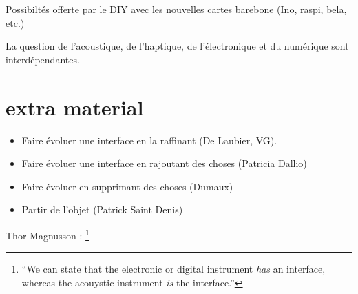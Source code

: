Possibiltés offerte par le DIY avec les nouvelles cartes barebone (Ino, raspi, bela, etc.)

La question de l'acoustique, de l'haptique, de l'électronique et du numérique sont interdépendantes.







\section*{extra material}

 \cite{bin_hands_2017}

\vspace{-1em}
\begin{itemize}[noitemsep]
\item Faire évoluer une interface en la raffinant (De Laubier, VG).
\item Faire évoluer une interface en rajoutant des choses (Patricia Dallio)
\item Faire évoluer en supprimant des choses (Dumaux)
\item Partir de l'objet (Patrick Saint Denis)
\end{itemize}


Thor Magnusson : \footnote{``We can state that the electronic or digital instrument \textit{has} an interface, whereas the acouystic instrument \textit{is} the interface.''\cite{magnusson_sonic_2019}}
